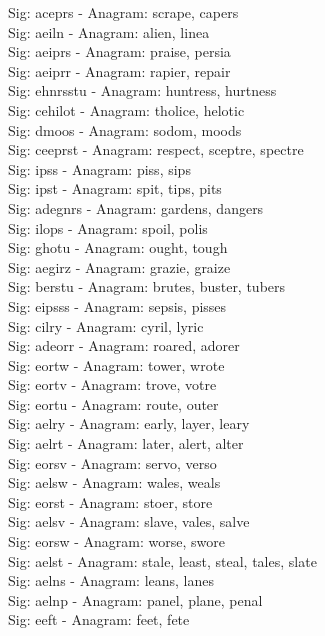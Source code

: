 Sig: {aceprs} - Anagram: scrape, capers \\
Sig: {aeiln} - Anagram: alien, linea \\
Sig: {aeiprs} - Anagram: praise, persia \\
Sig: {aeiprr} - Anagram: rapier, repair \\
Sig: {ehnrsstu} - Anagram: huntress, hurtness \\
Sig: {cehilot} - Anagram: tholice, helotic \\
Sig: {dmoos} - Anagram: sodom, moods \\
Sig: {ceeprst} - Anagram: respect, sceptre, spectre \\
Sig: {ipss} - Anagram: piss, sips \\
Sig: {ipst} - Anagram: spit, tips, pits \\
Sig: {adegnrs} - Anagram: gardens, dangers \\
Sig: {ilops} - Anagram: spoil, polis \\
Sig: {ghotu} - Anagram: ought, tough \\
Sig: {aegirz} - Anagram: grazie, graize \\
Sig: {berstu} - Anagram: brutes, buster, tubers \\
Sig: {eipsss} - Anagram: sepsis, pisses \\
Sig: {cilry} - Anagram: cyril, lyric \\
Sig: {adeorr} - Anagram: roared, adorer \\
Sig: {eortw} - Anagram: tower, wrote \\
Sig: {eortv} - Anagram: trove, votre \\
Sig: {eortu} - Anagram: route, outer \\
Sig: {aelry} - Anagram: early, layer, leary \\
Sig: {aelrt} - Anagram: later, alert, alter \\
Sig: {eorsv} - Anagram: servo, verso \\
Sig: {aelsw} - Anagram: wales, weals \\
Sig: {eorst} - Anagram: stoer, store \\
Sig: {aelsv} - Anagram: slave, vales, salve \\
Sig: {eorsw} - Anagram: worse, swore \\
Sig: {aelst} - Anagram: stale, least, steal, tales, slate \\
Sig: {aelns} - Anagram: leans, lanes \\
Sig: {aelnp} - Anagram: panel, plane, penal \\
Sig: {eeft} - Anagram: feet, fete \\
